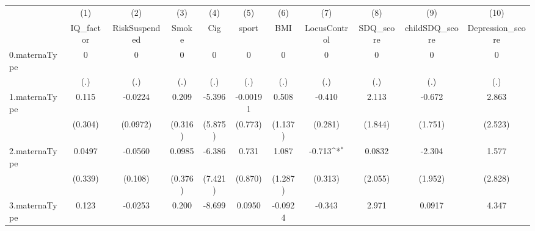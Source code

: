 {
\def\sym#1{\ifmmode^{#1}\else\(^{#1}\)\fi}
\begin{tabular}{l*{10}{c}}
\toprule
            &\multicolumn{1}{c}{(1)}&\multicolumn{1}{c}{(2)}&\multicolumn{1}{c}{(3)}&\multicolumn{1}{c}{(4)}&\multicolumn{1}{c}{(5)}&\multicolumn{1}{c}{(6)}&\multicolumn{1}{c}{(7)}&\multicolumn{1}{c}{(8)}&\multicolumn{1}{c}{(9)}&\multicolumn{1}{c}{(10)}\\
            &\multicolumn{1}{c}{IQ\_factor}&\multicolumn{1}{c}{RiskSuspended}&\multicolumn{1}{c}{Smoke}&\multicolumn{1}{c}{Cig}&\multicolumn{1}{c}{sport}&\multicolumn{1}{c}{BMI}&\multicolumn{1}{c}{LocusControl}&\multicolumn{1}{c}{SDQ\_score}&\multicolumn{1}{c}{childSDQ\_score}&\multicolumn{1}{c}{Depression\_score}\\
\midrule
0.maternaType&           0         &           0         &           0         &           0         &           0         &           0         &           0         &           0         &           0         &           0         \\
            &         (.)         &         (.)         &         (.)         &         (.)         &         (.)         &         (.)         &         (.)         &         (.)         &         (.)         &         (.)         \\
\addlinespace
1.maternaType&       0.115         &     -0.0224         &       0.209         &      -5.396         &    -0.00191         &       0.508         &      -0.410         &       2.113         &      -0.672         &       2.863         \\
            &     (0.304)         &    (0.0972)         &     (0.316)         &     (5.875)         &     (0.773)         &     (1.137)         &     (0.281)         &     (1.844)         &     (1.751)         &     (2.523)         \\
\addlinespace
2.maternaType&      0.0497         &     -0.0560         &      0.0985         &      -6.386         &       0.731         &       1.087         &      -0.713\sym{*}  &      0.0832         &      -2.304         &       1.577         \\
            &     (0.339)         &     (0.108)         &     (0.376)         &     (7.421)         &     (0.870)         &     (1.287)         &     (0.313)         &     (2.055)         &     (1.952)         &     (2.828)         \\
\addlinespace
3.maternaType&       0.123         &     -0.0253         &       0.200         &      -8.699         &      0.0950         &     -0.0924         &      -0.343         &       2.971         &      0.0917         &       4.347         \\

\end{tabular}}
